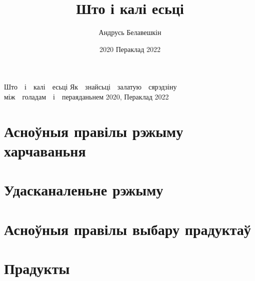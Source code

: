 \documentclass[ebook,10pt,openany]{memoir}
\author{Андрусь Белавешкін}
\title{Што і калі есьці}
\date{2020 Пераклад 2022}
\begin{document}

\cleartooddpage
\begin{titlingpage}
      {Што\ \ і\ \ калі\ \ есьці}
      {Як\ \ знайсьці\ \ залатую\ \ сярэдзіну між\ \ голадам\ \ і\ \ пераяданьнем}
      {2020, Пераклад 2022}



\end{titlingpage}

\pagestyle{headings}
\setcounter{page}{3}
\setcounter{tocdepth}{0}
\tableofcontents*
\clearpage



\part{Асноўныя правілы рэжыму харчаваньня}








\part{Удасканаленьне рэжыму}








\part{Асноўныя правілы выбару прадуктаў}








\part{Прадукты}







\end{document}
